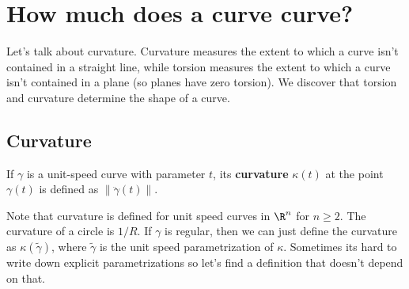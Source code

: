 \section{How much does a curve curve?}
Let's talk about curvature. Curvature measures the extent to which a curve isn't contained in a straight line, while torsion measures the extent to which a curve isn't contained in a plane (so planes have zero torsion). We discover that torsion and curvature determine the shape of a curve.
\subsection{Curvature}
\begin{definition}[]
    If $\gamma $ is a unit-speed curve with parameter $t$, its \textbf{curvature} $\kappa(t)$ at the point $\gamma (t)$ is defined as $\|\ddot \gamma (t)\|$. 
\end{definition}
Note that curvature is defined for unit speed curves in $\R^n $ for $n\geq 2$. The curvature of a circle is $1 /R$. If $\gamma $ is regular, then we can just define the curvature as $\kappa(\widetilde \gamma )$, where $\widetilde \gamma $ is the unit speed parametrization of $\kappa$. Sometimes its hard to write down explicit parametrizations so let's find a definition that doesn't depend on that.

